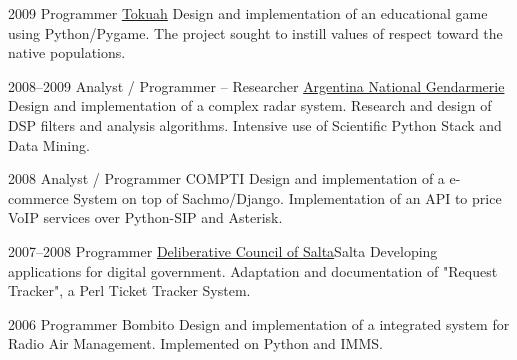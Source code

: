 \documentclass[11pt,a4paper]{moderncv}
\begin{document}
    \cventry          %
        {2009}          %
        {Programmer}          %
        {\href{http://tokuah.com.ar}{Tokuah}} {} {}          %
        {          %
            Design and implementation of an educational game using          %
                Python/Pygame.          %
            The project sought to instill values of respect                      %
                toward the native populations.                                   %
        }          %

    \cventry
        {2008--2009}
        {Analyst / Programmer -- Researcher}
        {\href{http://www.gendarmeria.gov.ar}{Argentina National Gendarmerie}} {} {}
        {
            Design and implementation of a complex radar system. Research and    %
                design of DSP filters and analysis algorithms.                   %
            Intensive use of Scientific Python Stack and Data Mining.            %
        }

    \cventry          %
        {2008}          %
        {Analyst / Programmer}          %
        {COMPTI} {} {}          %
        {          %
            Design and implementation of a e-commerce System on top of           %
            Sachmo/Django.                                                       %
            Implementation of an API to price VoIP services over Python-SIP and  %
            Asterisk.                                                            %
        }          %

    \cventry
        {2007--2008}
        {Programmer}
        {\href{http://softwarelibre.unsa.edu.ar/dsa/}{Deliberative Council of Salta}}{Salta}{}
        {
            Developing applications for digital government. Adaptation and       %
                documentation of "Request Tracker", a Perl Ticket Tracker        %
                System.                                                          %
        }

    \cventry
        {2006}
        {Programmer}
        {Bombito} {} {}
        {
            Design and implementation of a integrated system for Radio Air       %
            Management.                                                          %
            Implemented on Python and IMMS.                                      %
        }
\end{document}
